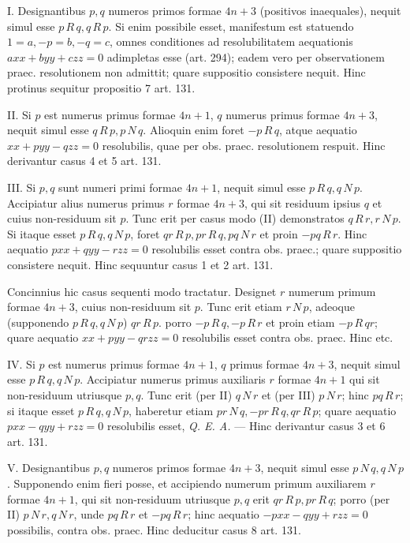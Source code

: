 I. Designantibus \(p,q\) numeros primos formae \(4n+3\) (positivos inaequales), nequit simul esse \(p\,R\,q,q\,R\,p\). Si enim possibile esset, manifestum est statuendo \(1=a,-p=b,-q=c\), omnes conditiones ad resolubilitatem aequationis \(axx+byy+czz=0\) adimpletas esse (art. 294); eadem vero per observationem praec. resolutionem non admittit; quare suppositio consistere nequit. Hinc protinus sequitur propositio 7 art. 131.

II. Si \(p\) est numerus primus formae \(4n+1\), \(q\) numerus primus formae \(4n+3\), nequit simul esse \(q\,R\,p,p\,N\,q\). Alioquin enim foret \(-p\,R\,q\), atque aequatio \(xx+pyy-qzz=0\) resolubilis, quae per obs. praec. resolutionem respuit. Hinc derivantur casus 4 et 5 art. 131.

III. Si \(p,q\) sunt numeri primi formae \(4n+1\), nequit simul esse \(p\,R\,q,q\,N\,p\). Accipiatur alius numerus primus \(r\) formae \(4n+3\), qui sit residuum ipsius \(q\) et cuius non-residuum sit \(p\). Tunc erit per casus modo (II) demonstratos \(q\,R\,r,r\,N\,p\). Si itaque esset \(p\,R\,q,q\,N\,p\), foret \(qr\,R\,p,pr\,R\,q,pq\,N\,r\) et proin \(-pq\,R\,r\). Hinc aequatio \(pxx+qyy-rzz=0\) resolubilis esset contra obs. praec.; quare suppositio consistere nequit. Hinc sequuntur casus 1 et 2 art. 131.

Concinnius hic casus sequenti modo tractatur. Designet \(r\) numerum primum formae \(4n+3\), cuius non-residuum sit \(p\). Tunc erit etiam \(r\,N\,p\), adeoque (supponendo \(p\,R\,q,q\,N\,p\)) \(qr\,R\,p\). porro \(-p\,R\,q,-p\,R\,r\) et proin etiam \(-p\,R\,qr\); quare aequatio \(xx+pyy-qrzz=0\) resolubilis esset contra obs. praec. Hinc etc.

IV. Si \(p\) est numerus primus formae \(4n+1\), \(q\) primus formae \(4n+3\),
nequit simul esse \(p\,R\,q,q\,N\,p\). Accipiatur numerus primus auxiliaris \(r\) formae \(4n+1\) qui sit non-residuum utriusque \(p,q\). Tunc erit (per II) \(q\,N\,r\) et (per III) \(p\,N\,r\); hinc \(pq\,R\,r\); si itaque esset \(p\,R\,q,q\,N\,p\), haberetur etiam \(pr\,N\,q,-pr\,R\,q,qr\,R\,p\); quare aequatio \(pxx-qyy+rzz=0\) resolubilis esset, \emph{Q. E. A.} --- Hinc derivantur casus 3 et 6 art. 131.

V. Designantibus \(p,q\) numeros primos formae \(4n+3\), nequit simul esse \(p\,N\,q,q\,N\,p\). Supponendo enim fieri posse, et accipiendo numerum primum auxiliarem \(r\) formae \(4n+1\), qui sit non-residuum utriusque \(p,q\) erit \(qr\,R\,p,pr\,R\,q\); porro (per II) \(p\,N\,r,q\,N\,r\), unde \(pq\,R\,r\) et \(-pq\,R\,r\); hinc aequatio \(-pxx-qyy+rzz=0\) possibilis, contra obs. praec. Hinc deducitur casus 8 art. 131.

